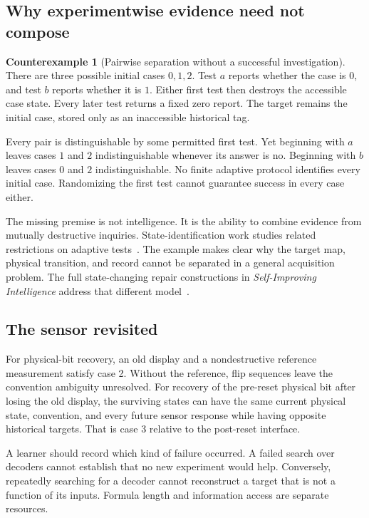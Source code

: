 \documentclass[11pt,letterpaper]{article}
\theoremstyle{plain}
\theoremstyle{definition}
\newtheorem{counterexample}[theorem]{Counterexample}
\begin{document}
\subsection{Why experimentwise evidence need not compose}
\begin{counterexample}[Pairwise separation without a successful investigation]\label{ce:destructive}
There are three possible initial cases $0,1,2$. Test $a$ reports whether the case is $0$, and test $b$ reports whether it is $1$. Either first test then destroys the accessible case state. Every later test returns a fixed zero report. The target remains the initial case, stored only as an inaccessible historical tag.

Every pair is distinguishable by some permitted first test. Yet beginning with $a$ leaves cases $1$ and $2$ indistinguishable whenever its answer is no. Beginning with $b$ leaves cases $0$ and $2$ indistinguishable. No finite adaptive protocol identifies every initial case. Randomizing the first test cannot guarantee success in every case either.
\end{counterexample}

The missing premise is not intelligence. It is the ability to combine evidence from mutually destructive inquiries. State-identification work studies related restrictions on adaptive tests~\cite{stateid}. The example makes clear why the target map, physical transition, and record cannot be separated in a general acquisition problem. The full state-changing repair constructions in \emph{Self-Improving Intelligence} address that different model~\cite{selfimproving}.

\subsection{The sensor revisited}
For physical-bit recovery, an old display and a nondestructive reference measurement satisfy case 2. Without the reference, flip sequences leave the convention ambiguity unresolved. For recovery of the pre-reset physical bit after losing the old display, the surviving states can have the same current physical state, convention, and every future sensor response while having opposite historical targets. That is case 3 relative to the post-reset interface.

A learner should record which kind of failure occurred. A failed search over decoders cannot establish that no new experiment would help. Conversely, repeatedly searching for a decoder cannot reconstruct a target that is not a function of its inputs. Formula length and information access are separate resources.
\end{document}
